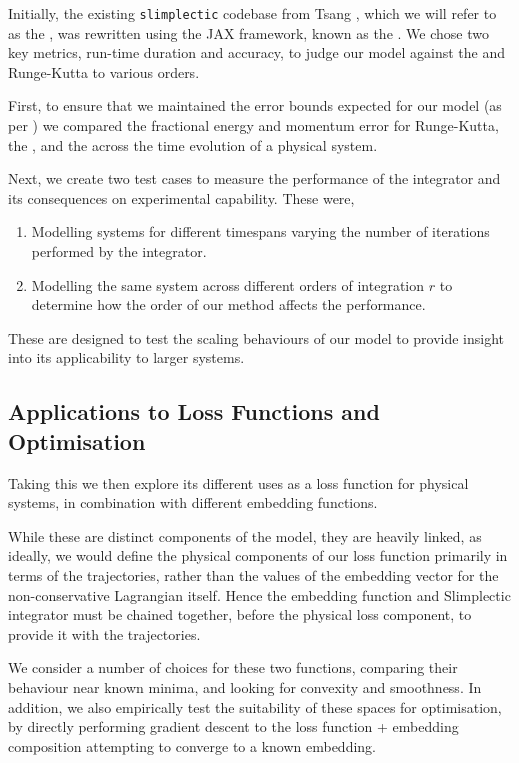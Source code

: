 Initially, the existing \texttt{slimplectic} codebase from Tsang \etall \cite{originalCode}, which we will refer to as the \orgimpl{}, was rewritten using the JAX framework, known as the \updimpl{}. We chose two key metrics, run-time duration and accuracy, to judge our model against the \orgimpl{} and Runge-Kutta to various orders.

First, to ensure that we maintained the error bounds expected for our model (as per ) we compared the fractional energy and momentum error for Runge-Kutta, the \orgimpl{}, and the \updimpl{} across the time evolution of a physical system.

Next, we create two test cases to measure the performance of the integrator and its consequences on experimental capability. These were,

\begin{enumerate}
	\item Modelling systems for different timespans varying the number of iterations performed by the integrator.
	\item Modelling the same system across different orders of integration $r$ to determine how the order of our method affects the performance.
\end{enumerate}

These are designed to test the scaling behaviours of our model to provide insight into its applicability to larger systems.

\subsection{Applications to Loss Functions and Optimisation}

Taking this \updimpl{} we then explore its different uses as a loss function for physical systems, in combination with different embedding functions.

While these are distinct components of the model, they are heavily linked, as ideally, we would define the physical components of our loss function primarily in terms of the trajectories, rather than the values of the embedding vector for the non-conservative Lagrangian itself.
Hence the embedding function and Slimplectic integrator must be chained together, before the physical loss component, to provide it with the trajectories.

We consider a number of choices for these two functions, comparing their behaviour near known minima, and looking for convexity and smoothness. In addition, we also empirically test the suitability of these spaces for optimisation, by directly performing gradient descent to the loss function + embedding composition attempting to converge to a known embedding.

